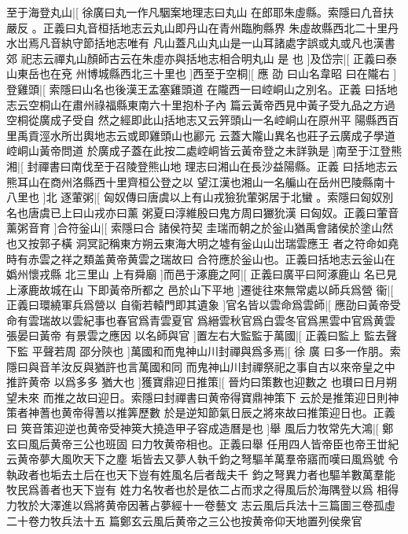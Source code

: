%
至于海登丸山|[%
徐廣曰丸一作凡駰案地理志曰丸山%
在郎耶朱虛縣。索隱曰凢音扶嚴反%
%
。正義曰丸音桓括地志云丸山即丹山在青州臨朐縣界%
朱虛故縣西北二十里丹水岀焉凡音紈守節括地志唯有%
%
凡山蓋凡山丸山是一山耳諸處字誤或丸或凡也漢書郊%
祀志云禪丸山顏師古云在朱虛亦與括地志相合明丸山%
是%
也%
]及岱宗|[%
正義曰泰山東岳也在兗%
州博城縣西北三十里也%
]西至于空桐|[%
應%
劭%
%
曰山名韋昭%
曰在隴右%
]登雞頭|[%
索隱曰山名也後漢王孟塞雞頭道%
在隴西一曰崆峒山之別名。正義%
%
曰括地志云空桐山在肅州祿福縣東南六十里抱朴子內%
篇云黃帝西見中黃子受九品之方過空桐從廣成子受自%
%
然之經即此山括地志又云笄頭山一名崆峒山在原州平%
陽縣西百里禹貢涇水所岀輿地志云或即雞頭山也酈元%
%
云蓋大隴山異名也莊子云廣成子學道崆峒山黃帝問道%
於廣成子蓋在此按二處崆峒皆云黃帝登之未詳孰是%
%
]南至于江登熊湘|[%
封禪書曰南伐至于召陵登熊山地%
理志曰湘山在長沙益陽縣。正義%
%
曰括地志云熊耳山在商州洛縣西十里齊桓公登之以%
望江漢也湘山一名艑山在岳州巴陵縣南十八里也%
]北%
%
逐葷粥|[%
匈奴傳曰唐虞以上有山戎獫狁葷粥居于北蠻%
。索隱曰匈奴別名也唐虞已上曰山戎亦曰薰%
%
粥夏曰淳維殷曰鬼方周曰玁狁漢%
曰匈奴。正義曰葷音薰粥音育%
]合符釡山|[%
索隱曰合%
諸侯符契%
%
圭瑞而朝之於釡山猶禹會諸侯於塗山然也又按郭子橫%
洞冥記稱東方朔云東海大明之墟有釡山山岀瑞雲應王%
%
者之符命如堯時有赤雲之祥之類盖黄帝黄雲之瑞故曰%
合符應於釡山也。正義曰括地志云釡山在嬀州懷戎縣%
%
北三里山%
上有舜廟%
]而邑于涿鹿之阿|[%
正義曰廣平曰阿涿鹿山%
名已見上涿鹿故城在山%
%
下即黃帝所都之%
邑於山下平地%
]遷徙往來無常處以師兵爲營%
%
衞|[%
正義曰環繞軍兵爲營以%
自衞若轅門即其遺象%
]官名皆以雲命爲雲師|[%
%
應劭曰黃帝受命有雲瑞故以雲紀事也春官爲青雲夏官%
爲縉雲秋官爲白雲冬官爲黑雲中官爲黄雲張晏曰黃帝%
%
有景雲之應因%
以名師與官%
]置左右大監監于萬國|[%
正義曰監上%
監去聲下監%
%
平聲若周%
邵分陝也%
]萬國和而鬼神山川封禪與爲多焉|[%
徐%
廣%
%
曰多一作朋。索隱曰與音羊汝反與猶許也言萬國和同%
而鬼神山川封禪祭祀之事自古以來帝皇之中推許黄帝%
%
以爲多多%
猶大也%
]獲寶鼎迎日推策|[%
晉灼曰策數也迎數之%
也瓉曰日月朔望未來%
%
而推之故曰迎日。索隱曰封禪書曰黄帝得寶鼎神策下%
云於是推策迎日則神策者神蓍也黄帝得蓍以推筭歷數%
%
於是逆知節氣日辰之將來故曰推策迎日也。正義曰%
筴音策迎逆也黄帝受神筴大撓造甲子容成造曆是也%
]舉%
%
風后力牧常先大鴻|[%
鄭玄曰風后黄帝三公也班固%
曰力牧黄帝相也。正義曰舉%
%
任用四人皆帝臣也帝王丗紀云黄帝夢大風吹天下之塵%
垢皆去又夢人執千鈞之弩驅羊萬羣帝寤而嘆曰風爲號%
%
令執政者也垢去土后在也天下豈有姓風名后者哉夫千%
鈞之弩異力者也驅羊數萬羣能牧民爲善者也天下豈有%
%
姓力名牧者也於是依二占而求之得風后於海隅登以爲%
相得力牧於大澤進以爲將黄帝因著占夢經十一卷藝文%
%
志云風后兵法十三篇圖三卷孤虛二十卷力牧兵法十五%
篇鄭玄云風后黄帝之三公也按黄帝仰天地置列侯衆官%

